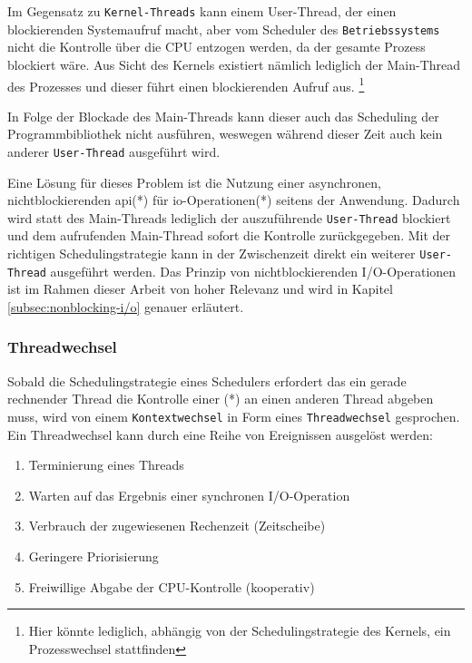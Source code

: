 Im Gegensatz zu \verb|Kernel-Threads| kann einem User-Thread, der einen blockierenden Systemaufruf macht,
aber vom Scheduler des \verb|Betriebssystems| nicht die Kontrolle über die CPU entzogen werden, da der gesamte Prozess blockiert wäre.
Aus Sicht des Kernels existiert nämlich lediglich der Main-Thread des Prozesses und dieser
führt einen blockierenden Aufruf aus. \footnote{Hier könnte lediglich, abhängig von der Schedulingstrategie des Kernels, ein Prozesswechsel stattfinden}

In Folge der Blockade des Main-Threads kann dieser auch das Scheduling der Programmbibliothek nicht ausführen, weswegen während dieser
Zeit auch kein anderer \verb|User-Thread| ausgeführt wird.

Eine Lösung für dieses Problem ist die Nutzung einer asynchronen, nichtblockierenden \acrshort{api}(*) für \gls{io}-Operationen(*)
seitens der Anwendung.
Dadurch wird statt des Main-Threads lediglich der auszuführende \verb|User-Thread| blockiert und dem aufrufenden Main-Thread
sofort die Kontrolle zurückgegeben. Mit der richtigen Schedulingstrategie kann in der Zwischenzeit direkt ein
weiterer \verb|User-Thread| ausgeführt werden. \parencite[Kapitel 2.2.4]{Tanenbaum2016}
Das Prinzip von nichtblockierenden I/O-Operationen ist im Rahmen dieser Arbeit von hoher Relevanz und wird in Kapitel \ref{subsec:nonblocking-i/o}
genauer erläutert.

\subsubsection{Threadwechsel}
\label{subsubsec:threadwechsel}
Sobald die Schedulingstrategie eines Schedulers erfordert das ein gerade rechnender Thread die Kontrolle einer (*) an
einen anderen Thread abgeben muss, wird von einem \verb|Kontextwechsel| in Form eines \verb|Threadwechsel| gesprochen.
Ein Threadwechsel kann durch eine Reihe von Ereignissen ausgelöst werden:
\begin{enumerate}
  \item Terminierung eines Threads
  \item Warten auf das Ergebnis einer synchronen I/O-Operation
  \item Verbrauch der zugewiesenen Rechenzeit (Zeitscheibe)
  \item Geringere Priorisierung
  \item Freiwillige Abgabe der CPU-Kontrolle (kooperativ)
\end{enumerate}

